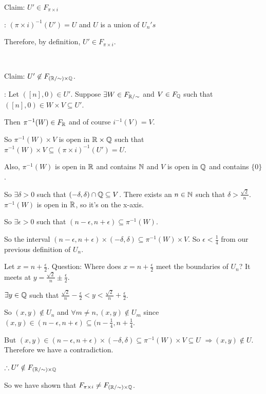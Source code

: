 Claim: $U' \in F_{\pi \times i}$

\proof: $(\pi \times i)^{-1}(U') = U$ and $U$ is a union of $U_n 's$

Therefore, by definition, $U'\in F_{\pi\times i}$.

\mbox{ }

Claim: $U'\not\in F_{(\mathbb R/\sim) \times \mathbb Q}$.

\proof: Let $([n],0) \in U'$. Suppose $\exists W \in F_{\mathbb R/\sim}$ and $V \in F_{\mathbb Q}$ such that $([n], 0)\in W \times V \subseteq U'$.

Then $\pi^{-1}(W) \in F_{\mathbb R}$ and of course $i^{-1}(V) = V$.

So $\pi^{-1}(W) \times V$ is open in $\mathbb R\times \mathbb Q$ such that $\pi^{-1}(W) \times V \subseteq (\pi \times i)^{-1}(U') = U$.

Also, $\pi^{-1}(W)$ is open in $\mathbb R$ and contains $\mathbb N$ and $V$ is open in $\mathbb Q$ and contains $\{0\}$.

So $\exists \delta >0$ such that $(-\delta, \delta) \cap \mathbb Q \subseteq V$. There exists an $n\in \mathbb N$ such that $\delta > \frac{\sqrt{2}}{n}$. $\pi^{-1}(W)$ is open in $\mathbb R$, so it's on the x-axis.

So $\exists \epsilon >0$ such that $(n-\epsilon, n+\epsilon)\subseteq \pi^{-1}(W)$.

So the interval $(n-\epsilon, n+\epsilon)\times (-\delta, \delta)\subseteq \pi^{-1}(W)\times V$. So $\epsilon < \frac{1}{4}$ from our previous definition of $U_n$.

Let $x = n + \frac{\epsilon}{2}$. Question: Where does $x = n + \frac{\epsilon}{2}$ meet the boundaries of $U_n$? It meets at $y = \frac{\sqrt{2}}{n} \pm \frac{\epsilon}{2}$.

$\exists y \in \mathbb Q$ such that $\frac{\sqrt{2}}{n} - \frac{\epsilon}{2} < y < \frac{\sqrt{2}}{n} + \frac{\epsilon}{2}$.

So $(x,y) \notin U_n$ and $\forall m\neq n, (x,y)\notin U_m$ since $(x,y) \in (n-\epsilon, n+\epsilon)\subseteq (n-\frac{1}{4}, n+\frac{1}{4}$.

But $(x,y) \in (n-\epsilon, n+\epsilon) \times (-\delta, \delta) \subseteq \pi^{-1}(W) \times V \subseteq U$ $\Rightarrow (x,y) \notin U$. Therefore we have a contradiction.

$\therefore U' \notin F_{(\mathbb R/\sim)\times \mathbb Q}$

So we have shown that $F_{\pi\times i} \neq F_{(\mathbb R/\sim) \times \mathbb Q}$.

